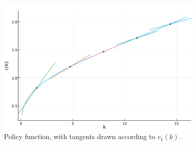 \documentclass[a4paper,11pt]{article}
\begin{document}
\begin{figure}
  \centering
  \includegraphics[width=0.9\textwidth]{../fig/ck-tangents.pdf}
  \caption{Policy function, with tangents drawn according to $c_1(k)$.}
  \label{fig:policy-tangents}
\end{figure}

\clearpage
\printbibliography
\end{document}
